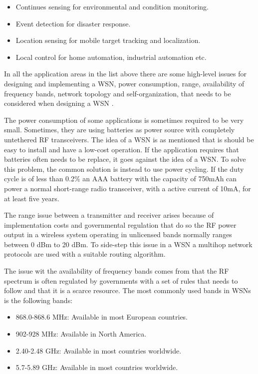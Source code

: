 \begin{itemize}
   \item Continues sensing for environmental and condition monitoring.
   \item Event detection for disaster response.
   \item Location sensing for mobile target tracking and localization.
   \item Local control for home automation, industrial automation etc.
\end{itemize}

In all the application areas in the list above there are some high-level issues for designing and implementing a WSN, power consumption, range, availability of frequency bands, network topology and self-organization, that needs to be considered when designing a WSN \citep{gutierrez2004low}.

The power consumption of some applications is sometimes required to be very small. Sometimes, they are using batteries as power source with completely untethered RF transceivers. The idea of a WSN is as mentioned that is should be easy to install and have a low-cost operation. If the application requires that batteries often needs to be replace, it goes against the idea of a WSN. To solve this problem, the common solution is instead to use power cycling. If the duty cycle is of less than 0.2\% an AAA battery with the capacity of 750mAh can power a normal short-range radio transceiver, with a active current of 10mA, for at least five years. 

The range issue between a transmitter and receiver arises because of implementation costs and governmental regulation that do so the RF power output in a wireless system operating in unlicensed bands normally ranges between 0 dBm to 20 dBm. To side-step this issue in a WSN a multihop network protocols are used with a suitable routing algorithm.

The issue wit the availability of frequency bands comes from that the RF spectrum is often regulated by governments with a set of rules that needs to follow and that it is a scarce resource. The most commonly used bands in WSNs is the following bands:

\begin{itemize}
   \item 868.0-868.6 MHz: Available in most European countries.
   \item 902-928 MHz: Available in North America.
   \item 2.40-2.48 GHz: Available in most countries worldwide.
   \item 5.7-5.89 GHz: Available in most countries worldwide.
\end{itemize}

